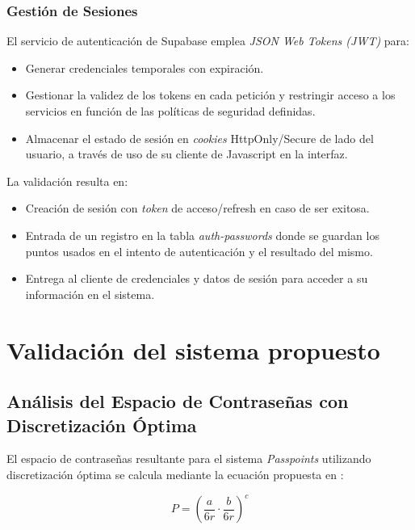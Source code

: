 \subsubsection{Gestión de Sesiones}
El servicio de autenticación de Supabase emplea \textit{JSON Web Tokens (JWT)} para:

\begin{itemize}
	\item Generar credenciales temporales con expiración.
	\item Gestionar la validez de los tokens en cada petici\'on y restringir acceso a los servicios en funci\'on de las pol\'iticas de seguridad definidas.
	\item Almacenar el estado de sesión en \textit{cookies} HttpOnly/Secure de lado del usuario, a trav\'es de uso de su cliente de Javascript en la interfaz.
\end{itemize}

La validación resulta en:
\begin{itemize}
	\item Creación de sesión con \textit{token} de acceso/refresh en caso de ser exitosa.
	\item Entrada de un registro en la tabla \textit{auth-passwords} donde se guardan los puntos usados en el intento de autenticaci\'on y el resultado del mismo.
	\item Entrega al cliente de credenciales y datos de sesi\'on para acceder a su informaci\'on en el sistema.
\end{itemize}

\section{Validaci\'on del sistema propuesto}

\subsection{Análisis del Espacio de Contraseñas con Discretización Óptima}
\label{subsec:espacio-contrasenas}

El espacio de contraseñas resultante para el sistema \textit{Passpoints} utilizando discretización óptima se calcula mediante la ecuación propuesta en \cite{birget2006graphical}:

\begin{equation}
	P = \left( \frac{a}{6r} \cdot \frac{b}{6r} \right)^c
	\label{eq:espacio-contrasenas}
\end{equation}

